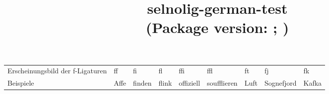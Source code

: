 \documentclass[ngerman]{article}
\title{selnolig-german-test\\ (Package version: \selnoligpackageversion; \selnoligpackagedate)}
\author{\null}
\date{}
\begin{document}
\gpp
\maketitle

\begin{tabular}{@{} *{9}{l} }
Erscheinungsbild der f-Ligaturen
   &ff &fi &fl &ffi &ffl &ft & \mbox{fj} &\mbox{fk}\\
Beispiele
   &Affe &finden &flink &offiziell &soufflieren & Luft & Sognefjord &Kafka\\
\end{tabular}

\bigskip

\begin{multicols}{2}

\end{multicols}
\end{document}
